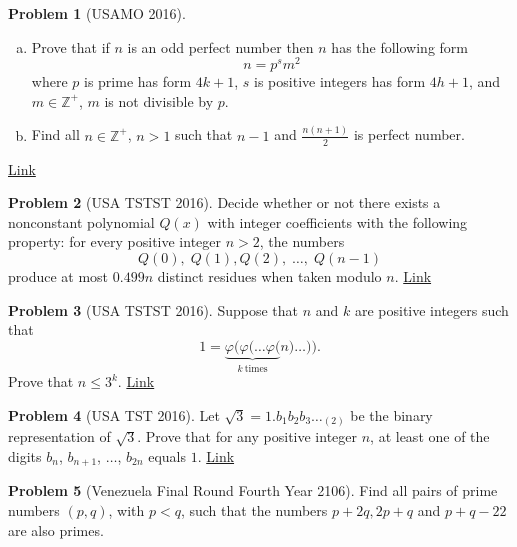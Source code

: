\documentclass[]{article}
\theoremstyle{definition}
\newtheorem{problem}{Problem}
\begin{document}
\begin{problem}[USAMO 2016]
	$ $
	\begin{enumerate}[(a)]
		\item Prove that if $n$ is an odd perfect number then $n$ has the following form \[ n=p^sm^2 \]where $p$ is prime has form $4k+1$, $s$ is positive integers has form $4h+1$, and $m\in\mathbb{Z}^+$, $m$ is not divisible by $p$.
		\item Find all $n\in\mathbb{Z}^+$, $n>1$ such that $n-1$ and $\frac{n(n+1)}{2}$ is perfect number.
	\end{enumerate}
	\flushright \href{http://artofproblemsolving.com/community/c6h1182397p5729489}{Link}
\end{problem}



\begin{problem}[USA TSTST 2016]
	Decide whether or not there exists a nonconstant polynomial $Q(x)$ with integer coefficients with the following property: for every positive integer $n > 2$, the numbers \[ Q(0), \; Q(1), Q(2), \; \dots, \; Q(n-1) \]produce at most $0.499n$ distinct residues when taken modulo $n$. \hfill \href{http://artofproblemsolving.com/community/c6h1264175p6575217}{Link}
\end{problem}



\begin{problem}[USA TSTST 2016]
	Suppose that $n$ and $k$ are positive integers such that \[ 1 = \underbrace{\varphi( \varphi( \dots \varphi(}_{k\ \text{times}} n) \dots )). \]Prove that $n \le 3^k$. \hfill \href{http://artofproblemsolving.com/community/c6h1264726p6580534}{Link}
\end{problem}


\begin{problem}[USA TST 2016]
	Let $\sqrt 3 = 1.b_1b_2b_3 \dots _{(2)}$ be the binary representation of $\sqrt 3$. Prove that for any positive integer $n$, at least one of the digits $b_n$, $b_{n+1}$, $\dots$, $b_{2n}$ equals $1$. \hfill \href{http://artofproblemsolving.com/community/c6h1243905p6368201}{Link}
\end{problem}




\begin{problem}[Venezuela Final Round Fourth Year 2106]
	Find all pairs of prime numbers $(p, q)$, with $p <q$, such that the numbers $p + 2q, 2p + q$ and $p + q - 22$ are also primes.
\end{problem}
\end{document}
